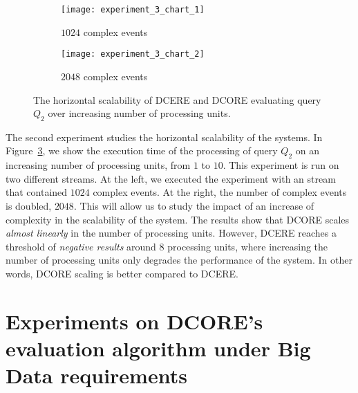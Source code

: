 \begin{figure}[H]
     \begin{adjustbox}{max width=1.3\linewidth,center}
     \centering
     \begin{subfigure}[b]{0.7\textwidth}
         \centering
         \texttt{[image: experiment\_3\_chart\_1]}
         \caption{$1024$ complex events}
         \label{fig:experiment:3:subfigure:1}
     \end{subfigure}
     \begin{subfigure}[b]{0.7\textwidth}
         \centering
         \texttt{[image: experiment\_3\_chart\_2]}
         \caption{$2048$ complex events}
         \label{fig:experiment:3:subfigure:1}
     \end{subfigure}
     \end{adjustbox}
     \caption{The horizontal scalability of DCERE and DCORE evaluating query $Q_{2}$ over increasing number of processing units.}
     \label{fig:experiment:3}
\end{figure}

The second experiment studies the horizontal scalability of the systems. In Figure~\ref{fig:experiment:3}, we show the execution time of the processing of query $Q_{2}$ on an increasing number of processing units, from $1$ to $10$. This experiment is run on two different streams. At the left, we executed the experiment with an stream that contained $1024$ complex events. At the right, the number of complex events is doubled, $2048$. This will allow us to study the impact of an increase of complexity in the scalability of the system. The results show that DCORE scales \emph{almost linearly} in the number of processing units. However, DCERE reaches a threshold of \emph{negative results} around $8$ processing units, where increasing the number of processing units only degrades the performance of the system. In other words, DCORE scaling is better compared to DCERE.

\section{Experiments on DCORE's evaluation algorithm under Big Data requirements}\label{sec:new-algorithm}

